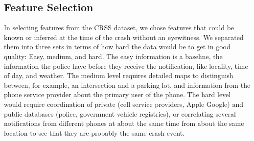 \subsection{Feature Selection}

In selecting features from the CRSS dataset, we chose features that could be known or inferred at the time of the crash without an eyewitness.  We separated them into three sets in terms of how hard the data would be to get in good quality:  Easy, medium, and hard.  The easy information is a baseline, the information the police have before they receive the notification, like locality, time of day, and weather.    The medium level requires detailed maps to distinguish between, for example, an intersection and a parking lot, and information from the phone service provider about the primary user of the phone.  The hard level would require coordination of private (cell service providers, Apple Google) and public databases (police, government vehicle registries), or correlating several notifications from different phones at about the same time from about the same location to see that they are probably the same crash event.  


